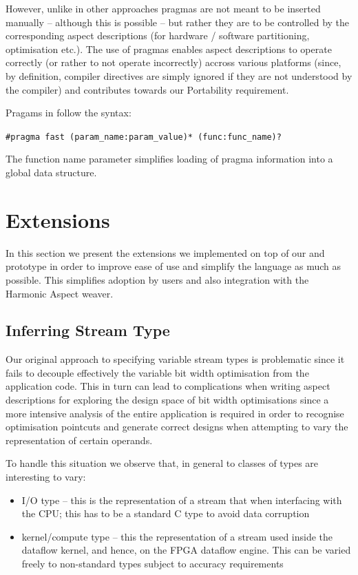 However, unlike in other approaches pragmas are not
meant to be inserted manually -- although this is possible -- but
rather they are to be controlled by the corresponding aspect
descriptions (for hardware / software partitioning, optimisation
etc.). The use of pragmas enables aspect descriptions to operate
correctly (or rather to not operate incorrectly) accross various
platforms (since, by definition, compiler directives are simply
ignored if they are not understood by the compiler) and contributes
towards our Portability requirement.

Pragams in \FAST{} follow the syntax:

\texttt{\#pragma fast (param\_name:param\_value)* (func:func\_name)?}

The function name parameter simplifies loading of pragma information
into a global data structure.

\section{Extensions}

\label{sec:fast-extensions}

In this section we present the extensions we implemented on top of our
\FAST{} and \fastc{} prototype in order to improve ease of use and
simplify the language as much as possible. This simplifies adoption by
users and also integration with the Harmonic Aspect weaver.

\subsection{Inferring Stream Type}
\label{sec:inf-stream-type}

Our original approach to specifying variable stream types is
problematic since it fails to decouple effectively the variable bit
width optimisation from the application code. This in turn can lead to
complications when writing aspect descriptions for exploring the
design space of bit width optimisations since a more intensive
analysis of the entire application is required in order to recognise
optimisation pointcuts and generate correct designs when attempting to
vary the representation of certain operands.

To handle this situation we observe that, in general to classes of
types are interesting to vary:
\begin{itemize}
\item I/O type -- this is the representation of a stream that when
  interfacing with the CPU; this has to be a standard C type to avoid
  data corruption
\item kernel/compute type -- this the representation of a stream used
  inside the dataflow kernel, and hence, on the FPGA dataflow
  engine. This can be varied freely to non-standard types subject to
  accuracy requirements
\end{itemize}

